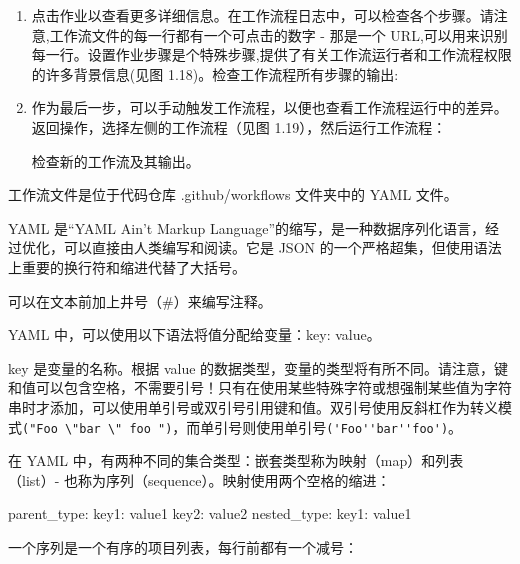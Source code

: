 \begin{enumerate}

\item 
点击作业以查看更多详细信息。在工作流程日志中，可以检查各个步骤。请注意,工作流文件的每一行都有一个可点击的数字 - 那是一个 URL,可以用来识别每一行。设置作业步骤是个特殊步骤,提供了有关工作流运行者和工作流程权限的许多背景信息(见图 1.18)。检查工作流程所有步骤的输出:


\item 
作为最后一步，可以手动触发工作流程，以便也查看工作流程运行中的差异。返回操作，选择左侧的工作流程（见图 1.19），然后运行工作流程：


检查新的工作流及其输出。

\end{enumerate}


工作流文件是位于代码仓库 .github/workflows 文件夹中的 YAML 文件。


YAML 是“YAML Ain’t Markup Language”的缩写，是一种数据序列化语言，经过优化，可以直接由人类编写和阅读。它是 JSON 的一个严格超集，但使用语法上重要的换行符和缩进代替了大括号。

可以在文本前加上井号（\#）来编写注释。

YAML 中，可以使用以下语法将值分配给变量：key: value。

key 是变量的名称。根据 value 的数据类型，变量的类型将有所不同。请注意，键和值可以包含空格，不需要引号！只有在使用某些特殊字符或想强制某些值为字符串时才添加，可以使用单引号或双引号引用键和值。双引号使用反斜杠作为转义模式\verb|("Foo \"bar \" foo ")|，而单引号则使用单引号\verb|('Foo''bar''foo')|。


在 YAML 中，有两种不同的集合类型：嵌套类型称为映射（map）和列表（list）- 也称为序列（sequence）。映射使用两个空格的缩进：

\begin{shell}
parent_type:
  key1: value1
  key2: value2
  nested_type:
    key1: value1
\end{shell}

一个序列是一个有序的项目列表，每行前都有一个减号：

